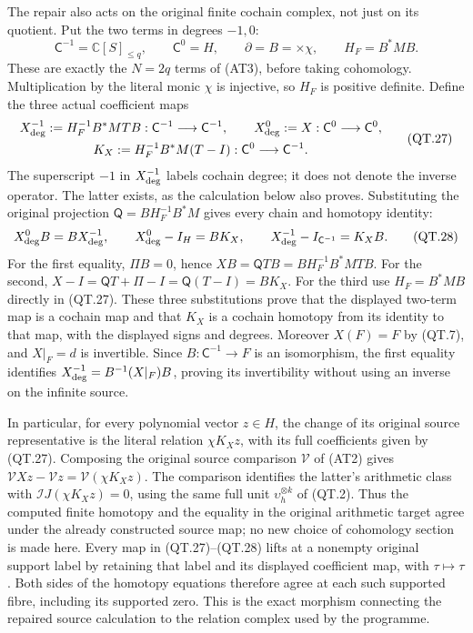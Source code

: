 The repair also acts on the original finite cochain complex, not just
on its quotient. Put the two terms in degrees \(-1,0\):
\[
 \mathsf C^{-1}=\mathbb C[S]_{\le q},\qquad
 \mathsf C^0=H,\qquad
 \partial=B=\times\chi,\qquad H_F=B^*MB.
 \]
These are exactly the \(N=2q\) terms of (AT3), before taking
cohomology. Multiplication by the literal monic \(\chi\) is injective,
so \(H_F\) is positive definite. Define the three actual coefficient
maps
\[
 \begin{gathered}
 X^{-1}_{\rm deg}:=H_F^{-1}B^*MTB:
                     \mathsf C^{-1}\longrightarrow\mathsf C^{-1},
 \qquad X^0_{\rm deg}:=X:\mathsf C^0\longrightarrow\mathsf C^0,\\
 K_X:=H_F^{-1}B^*M(T-I):
                     \mathsf C^0\longrightarrow\mathsf C^{-1}.
 \end{gathered}
 \tag{QT.27}\label{CFStage:eq:qt-chainmaps}
\]
The superscript \(-1\) in \(X^{-1}_{\rm deg}\) labels cochain degree;
it does not denote the inverse operator. The latter exists, as the
calculation below also proves. Substituting the original projection
\(\mathsf Q=BH_F^{-1}B^*M\) gives every chain and homotopy identity:
\[
 X^0_{\rm deg}B=BX^{-1}_{\rm deg},\qquad
 X^0_{\rm deg}-I_H=BK_X,\qquad
 X^{-1}_{\rm deg}-I_{\mathsf C^{-1}}=K_XB.
 \tag{QT.28}\label{CFStage:eq:qt-chainhomotopy}
\]
For the first equality, \(\Pi B=0\), hence
\(XB=\mathsf QTB=BH_F^{-1}B^*MTB\).
For the second,
\(X-I=\mathsf QT+\Pi-I=\mathsf Q(T-I)=BK_X\).
For the third use \(H_F=B^*MB\) directly in (QT.27).
These three substitutions prove that the displayed two-term map is
a cochain map and that \(K_X\) is a cochain homotopy from its identity
to that map, with the displayed signs and degrees. Moreover
\(X(F)=F\) by (QT.7), and \(X|_F=d\) is invertible. Since
\(B:\mathsf C^{-1}\to F\) is an isomorphism, the first equality
identifies \(X^{-1}_{\rm deg}=B^{-1}(X|_F)B\), proving its
invertibility without using an inverse on the infinite source.

In particular, for every polynomial vector \(z\in H\), the change
of its original source representative is the literal relation
\(\chi K_Xz\), with its full coefficients given by (QT.27).
Composing the original source comparison \(\mathcal V\) of (AT2)
gives
\(\mathcal V Xz-\mathcal V z=\mathcal V(\chi K_Xz)\).
The comparison identifies the latter's arithmetic class with
\(\mathcal I J(\chi K_Xz)=0\), using the same full unit
\(\upsilon_h^{\otimes k}\) of (QT.2). Thus the computed finite
homotopy and the equality in the original arithmetic target agree
under the already constructed source map; no new choice of
cohomology section is made here.
Every map in (QT.27)--(QT.28) lifts at a nonempty original support
label by retaining that label and its displayed coefficient map,
with \(\tau\mapsto\tau\). Both sides of the homotopy equations
therefore agree at each such supported fibre, including its
supported zero. This is the exact morphism connecting the repaired
source calculation to the relation complex used by the programme.
